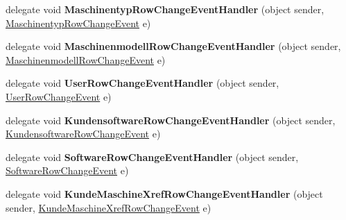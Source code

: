 \begin{DoxyCompactItemize}
\item 
delegate void {\bfseries Maschinentyp\+Row\+Change\+Event\+Handler} (object sender, \hyperlink{class_products_1_1_data_1_1ds_sage_1_1_maschinentyp_row_change_event}{Maschinentyp\+Row\+Change\+Event} e)\hypertarget{class_products_1_1_data_1_1ds_sage_a80ba1bd23533ec335d8aae87ae5bc27a}{}\label{class_products_1_1_data_1_1ds_sage_a80ba1bd23533ec335d8aae87ae5bc27a}

\item 
delegate void {\bfseries Maschinenmodell\+Row\+Change\+Event\+Handler} (object sender, \hyperlink{class_products_1_1_data_1_1ds_sage_1_1_maschinenmodell_row_change_event}{Maschinenmodell\+Row\+Change\+Event} e)\hypertarget{class_products_1_1_data_1_1ds_sage_ab951d30bdd2f2a06f11112bdb2d1ceeb}{}\label{class_products_1_1_data_1_1ds_sage_ab951d30bdd2f2a06f11112bdb2d1ceeb}

\item 
delegate void {\bfseries User\+Row\+Change\+Event\+Handler} (object sender, \hyperlink{class_products_1_1_data_1_1ds_sage_1_1_user_row_change_event}{User\+Row\+Change\+Event} e)\hypertarget{class_products_1_1_data_1_1ds_sage_a7955b2394732f9346353db13e7a3475b}{}\label{class_products_1_1_data_1_1ds_sage_a7955b2394732f9346353db13e7a3475b}

\item 
delegate void {\bfseries Kundensoftware\+Row\+Change\+Event\+Handler} (object sender, \hyperlink{class_products_1_1_data_1_1ds_sage_1_1_kundensoftware_row_change_event}{Kundensoftware\+Row\+Change\+Event} e)\hypertarget{class_products_1_1_data_1_1ds_sage_a4cb62073ae0d47b9ef71512dd9150f2b}{}\label{class_products_1_1_data_1_1ds_sage_a4cb62073ae0d47b9ef71512dd9150f2b}

\item 
delegate void {\bfseries Software\+Row\+Change\+Event\+Handler} (object sender, \hyperlink{class_products_1_1_data_1_1ds_sage_1_1_software_row_change_event}{Software\+Row\+Change\+Event} e)\hypertarget{class_products_1_1_data_1_1ds_sage_a72d1bd3dff5d47390e294d7e16a30375}{}\label{class_products_1_1_data_1_1ds_sage_a72d1bd3dff5d47390e294d7e16a30375}

\item 
delegate void {\bfseries Kunde\+Maschine\+Xref\+Row\+Change\+Event\+Handler} (object sender, \hyperlink{class_products_1_1_data_1_1ds_sage_1_1_kunde_maschine_xref_row_change_event}{Kunde\+Maschine\+Xref\+Row\+Change\+Event} e)\hypertarget{class_products_1_1_data_1_1ds_sage_a6989653a9bf4697f69330fd37f782285}{}\label{class_products_1_1_data_1_1ds_sage_a6989653a9bf4697f69330fd37f782285}


\end{DoxyCompactItemize}
